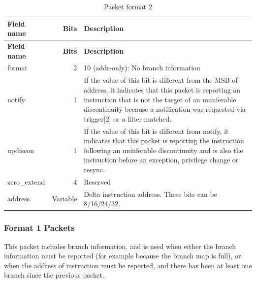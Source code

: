 \documentclass[main\_\_EN.tex]{subfiles}
\begin{document}
\begin{longtable}[c]{ |l|r|L{10cm}| }
    \caption{Packet format 2}
    \label{tab:f2}
    \\\hline{}
    \textbf{Field name} & \textbf{Bits} & \textbf{Description} \\\hline
    \endfirsthead
    \hline{}
    \textbf{Field name} & \textbf{Bits} & \textbf{Description} \\\hline
    \endhead
    \endfoot
    \endlastfoot

    format & 2 & 10 (addr-only): No branch information \\\hline
    notify & 1 & If the value of this bit is different from the MSB of address, it indicates that this packet is reporting an instruction that is not the target of an uninferable discontinuity because a notification was requested via trigger[2] or a filter matched. \\\hline
    updiscon & 1 & If the value of this bit is different from notify, it indicates that this packet is reporting the instruction following an uninferable discontinuity and is also the instruction before an exception, privilege change or resync. \\\hline
    zero\_extend & 4 & Reserved \\\hline
    address & Variable & Delta instruction address. These bits can be 8/16/24/32. \\\hline

 \end{longtable}


\subsubsection{Format 1 Packets}

This packet includes branch information, and is used when either the branch information must be reported (for example because the branch map is full), or when the address of instruction must be reported, and there has been at least one branch since the previous packet.
\end{document}
